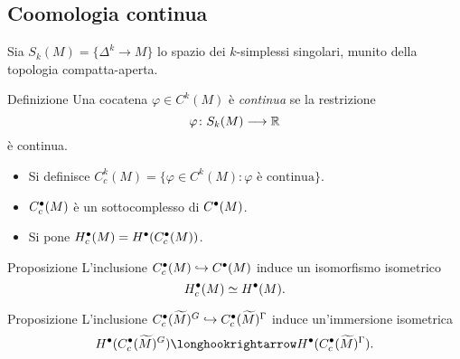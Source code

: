 \documentclass{beamer}
\begin{document}
\subsection*{Coomologia continua}
\begin{frame}{\secname}{\subsecname}
Sia $S_k(M)=\{\Delta^k\to M\}$ lo spazio dei $k$-simplessi singolari, munito della topologia compatta-aperta.
\begin{block}{Definizione}
Una cocatena $\varphi\in C^k(M)$ è \emph{continua} se la restrizione
\[
\map{\varphi}{S_k(M)}{\RR}
\]
è continua.
\end{block}
\begin{itemize}
\item Si definisce $C^k_c(M)=\{\varphi\in C^k(M):\text{$\varphi$ è continua}\}$.
\item $C^\bullet_c(M)$ è un sottocomplesso di $C^\bullet(M)$.
\item Si pone $H^\bullet_c(M)=H^\bullet(C^\bullet_c(M))$.
\end{itemize}
\end{frame}
\begin{frame}{\secname}{\subsecname}
\begin{block}{Proposizione}
L'inclusione $C^\bullet_c(M)\hookrightarrow C^\bullet(M)$ induce un isomorfismo isometrico
\[
H^\bullet_c(M)\simeq H^\bullet(M).
\]
\end{block}
\begin{block}{Proposizione}
L'inclusione $C^\bullet_c(\widetilde M)^G\hookrightarrow C^\bullet_c(\widetilde M)^\Gamma$ induce un'immersione isometrica
\[
H^\bul(C^\bul_c(\widetilde M)^G)\longhookrightarrow H^\bul(C^\bul_c(\widetilde M)^\Gamma).
\]
\end{block}
\end{frame}
\end{document}
